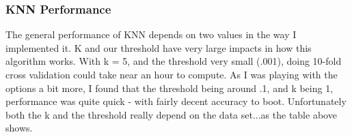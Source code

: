 \documentclass{article}
\begin{document}
\subsubsection{KNN Performance}
The general performance of KNN depends on two values in the way I implemented it.  K and our threshold have very large impacts in how this algorithm works.  With k = 5, and the threshold very small (.001), doing 10-fold cross validation could take near an hour to compute.  As I was playing with the options a bit more, I found that the threshold being around .1, and k being 1, performance was quite quick - with fairly decent accuracy to boot.  Unfortunately both the k and the threshold really depend on the data set...as the table above shows.
\end{document}
